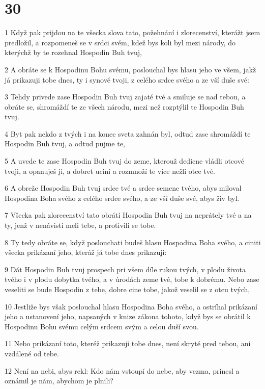 \chapter{30}

\par 1 Když pak prijdou na te všecka slova tato, požehnání i zlorecenství, kterážt jsem predložil, a rozpomeneš se v srdci svém, kdež bys koli byl mezi národy, do kterýchž by te rozehnal Hospodin Buh tvuj,
\par 2 A obráte se k Hospodinu Bohu svému, poslouchal bys hlasu jeho ve všem, jakž já prikazuji tobe dnes, ty i synové tvoji, z celého srdce svého a ze vší duše své:
\par 3 Tehdy privede zase Hospodin Buh tvuj zajaté tvé a smiluje se nad tebou, a obráte se, shromáždí te ze všech národu, mezi než rozptýlil te Hospodin Buh tvuj.
\par 4 Byt pak nekdo z tvých i na konec sveta zahnán byl, odtud zase shromáždí te Hospodin Buh tvuj, a odtud pujme te,
\par 5 A uvede te zase Hospodin Buh tvuj do zeme, kterouž dedicne vládli otcové tvoji, a opanuješ ji, a dobret uciní a rozmnoží te více nežli otce tvé.
\par 6 A obreže Hospodin Buh tvuj srdce tvé a srdce semene tvého, abys miloval Hospodina Boha svého z celého srdce svého, a ze vší duše své, abys živ byl.
\par 7 Všecka pak zlorecenství tato obrátí Hospodin Buh tvuj na neprátely tvé a na ty, jenž v nenávisti meli tebe, a protivili se tobe.
\par 8 Ty tedy obráte se, když poslouchati budeš hlasu Hospodina Boha svého, a ciniti všecka prikázaní jeho, kteráž já tobe dnes prikazuji:
\par 9 Dát Hospodin Buh tvuj prospech pri všem díle rukou tvých, v plodu života tvého i v plodu dobytka tvého, a v úrodách zeme tvé, tobe k dobrému. Nebo zase veseliti se bude Hospodin z tebe, dobre cine tobe, jakož veselil se z otcu tvých,
\par 10 Jestliže bys však poslouchal hlasu Hospodina Boha svého, a ostríhal prikázaní jeho a ustanovení jeho, napsaných v knize zákona tohoto, když bys se obrátil k Hospodinu Bohu svému celým srdcem svým a celou duší svou.
\par 11 Nebo prikázaní toto, kteréž prikazuji tobe dnes, není skryté pred tebou, ani vzdálené od tebe.
\par 12 Není na nebi, abys rekl: Kdo nám vstoupí do nebe, aby vezma, prinesl a oznámil je nám, abychom je plnili?
